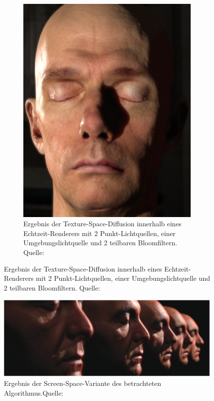 \documentclass[ngerman,runningheads,a4paper]{llncs}[2018/03/10]
\begin{document}
\begin{figure}
\begin{subfigure}{.5\textwidth}
    \includegraphics[scale=0.25,keepaspectratio]{./images/nvidia-result.jpg}
    \caption{Ergebnis der Texture-Space-Diffusion innerhalb eines Echtzeit-Renderers mit 2 Punkt-Lichtquellen, einer Umgebungslichtquelle und 2 teilbaren Bloomfiltern. Quelle: \cite{efficient-human-skin-rendering}}
    \label{fig:outlook-final-result}
  \end{subfigure}
\end{figure}

\begin{figure}
  \centering
  \includegraphics[scale=0.26,keepaspectratio]{./images/screen-space-sss.jpg}
  \caption{Ergebnis der Screen-Space-Variante des betrachteten Algorithmus.Quelle: \citet{screen-space-subsurface}}
  \label{fig:outlook-ssss}
\end{figure}
\end{document}
